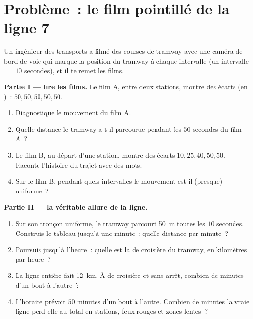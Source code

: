 \section{Problème~: le film pointillé de la ligne 7}

\begin{problem}\label{pb:g6:describing-motion:1}
Un ingénieur des transports a filmé des courses de tramway avec une
caméra de bord de voie qui marque la position du tramway à chaque
intervalle (un intervalle $=$ $10$ secondes), et il te remet les
films.

\medskip\noindent\textbf{Partie I --- lire les films.}
Le film A, entre deux stations, montre des écarts (en )~:
$50, 50, 50, 50, 50$.
\begin{enumerate}
  \item Diagnostique le mouvement du film A.
  \item Quelle distance le tramway a-t-il parcourue pendant les $50$
        secondes du film A~?
  \item Le film B, au départ d'une station, montre des écarts
        $10, 25, 40, 50, 50$. Raconte l'histoire du trajet avec des
        mots.
  \item Sur le film B, pendant quels intervalles le mouvement
        est-il (presque) uniforme~?
\end{enumerate}

\medskip\noindent\textbf{Partie II --- la véritable allure de la
ligne.}
\begin{enumerate}[resume]
  \item Sur son tronçon uniforme, le tramway parcourt \qty{50}{m}
        toutes les $10$ secondes. Construis le tableau jusqu'à une
        minute~: quelle distance par minute~?
  \item Poursuis jusqu'à l'heure~: quelle est la  de croisière
        du tramway, en kilomètres par heure~?
  \item La ligne entière fait \qty{12}{km}. À  de croisière
        et sans arrêt, combien de minutes d'un bout à l'autre~?
  \item L'horaire prévoit $50$ minutes d'un bout à l'autre. Combien
        de minutes la vraie ligne perd-elle au total en stations,
        feux rouges et zones lentes~?
\end{enumerate}


\end{problem}
